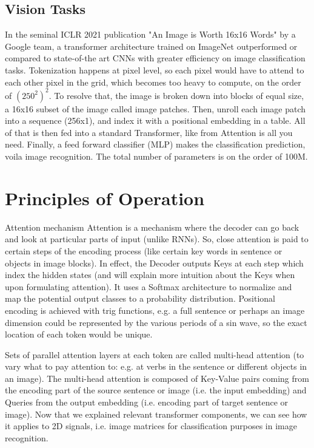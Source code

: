 \subsection{Vision Tasks}
In the seminal ICLR 2021 publication "An Image is Worth 16x16 Words" by a Google team,
a transformer architecture trained on ImageNet outperformed or compared to state-of-the art CNNs
with greater efficiency on image classification tasks.
Tokenization happens at pixel level, 
so each pixel would have to attend to  each other pixel in the grid, which becomes 
too heavy to compute, on the order of $(250^2)^2$. To resolve that, the image is 
broken down into blocks of equal size, a 16x16 subset of the image called image patches. 
Then, unroll each image patch into a sequence (256x1), and index it with a positional 
embedding in a table. All of that is then fed into a standard Transformer, 
like from Attention is all you need. Finally, a feed forward classifier (MLP) 
makes the classification prediction, voila image recognition.
The total number of parameters is on the order of 100M.


\section{Principles of Operation}

Attention mechanism \citep{Attention}
Attention is a mechanism where the decoder can go back and look at particular 
parts of input (unlike RNNs). So, close attention is paid to certain steps of 
the encoding process (like certain key words in sentence or objects in image blocks). 
In effect, the Decoder outputs Keys at each step which index the hidden states 
(and will explain more intuition about the Keys when upon formulating attention). 
It uses a Softmax architecture to normalize and map the potential output classes 
to a probability distribution. Positional encoding is achieved with trig functions, 
e.g. a full sentence or perhaps an image dimension could be represented by the various
periods of a sin wave, so the exact location of each token would be unique.

Sets of parallel attention layers at each token are called multi-head attention 
(to vary what to pay attention to: e.g. at verbs in the sentence or different objects 
in an image). The multi-head attention is composed of Key-Value pairs coming from 
the encoding part of the source sentence or image (i.e. the input embedding) and 
Queries from the output embedding (i.e. encoding part of target sentence or image).
Now that we explained relevant transformer components, we can see how it applies to 
2D signals, i.e. image matrices for classification purposes in image recognition.


